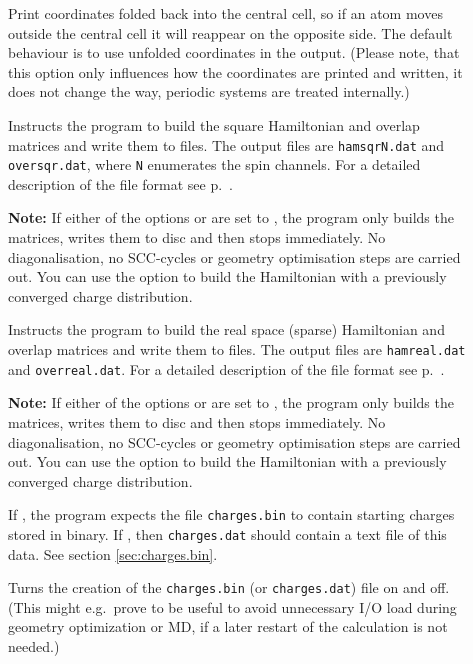 \begin{description}
\item[] Print coordinates folded back into the
  central cell, so if an atom moves outside the central cell it will
  reappear on the opposite side. The default behaviour is to use
  unfolded coordinates in the output. (Please note, that this option
  only influences how the coordinates are printed and written, it does
  not change the way, periodic systems are treated internally.)

\item[] Instructs the program to build the square
  Hamiltonian and overlap matrices and write them to files. The output
  files are \verb|hamsqrN.dat| and \verb|oversqr.dat|, where \verb|N|
  enumerates the spin channels. For a detailed description of the file
  format see p.~.

  \textbf{Note:} If either of the options  or  are
  set to , the program only builds the matrices, writes them to disc and
  then stops immediately. No diagonalisation, no SCC-cycles or geometry
  optimisation steps are carried out. You can use the 
  option to build the Hamiltonian with a previously converged charge
  distribution.

\item[] Instructs the program to build the real space
  (sparse) Hamiltonian and overlap matrices and write them to
  files. The output files are \verb|hamreal.dat| and
  \verb|overreal.dat|. For a detailed description of the file format
  see p.~.

  \textbf{Note:} If either of the options  or  are
  set to , the program only builds the matrices, writes them to disc and
  then stops immediately. No diagonalisation, no SCC-cycles or geometry
  optimisation steps are carried out. You can use the 
  option to build the Hamiltonian with a previously converged charge
  distribution.

\item[] If , the program expects the file
  \verb|charges.bin| to contain starting charges stored in binary. If ,
  then \verb|charges.dat| should contain a text file of this data. See section
  \ref{sec:charges.bin}.

\item[] Turns the creation of the
  \verb|charges.bin| (or \verb|charges.dat|) file on and off. (This might e.g.\
  prove to be useful to avoid unnecessary I/O load during geometry optimization or MD,
  if a later restart of the calculation is not needed.)


\end{description}
